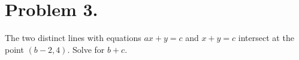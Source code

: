 \section{Problem 3.}
The two distinct lines with equations $ax + y = c$ and $x + y = c$
intersect at the point $(b - 2, 4)$.  Solve for $b + c$.

\begin{solution}

\end{solution}
